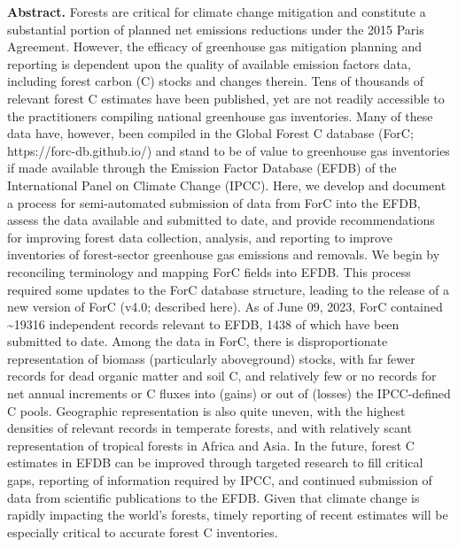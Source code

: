 \documentclass[, manuscript]{copernicus}
\begin{document}
\textbf{Abstract.} Forests are critical for climate change mitigation
and constitute a substantial portion of planned net emissions reductions
under the 2015 Paris Agreement. However, the efficacy of greenhouse gas
mitigation planning and reporting is dependent upon the quality of
available emission factors data, including forest carbon (C) stocks and
changes therein. Tens of thousands of relevant forest C estimates have
been published, yet are not readily accessible to the practitioners
compiling national greenhouse gas inventories. Many of these data have,
however, been compiled in the Global Forest C database (ForC;
https://forc-db.github.io/) and stand to be of value to greenhouse gas
inventories if made available through the Emission Factor Database
(EFDB) of the International Panel on Climate Change (IPCC). Here, we
develop and document a process for semi-automated submission of data
from ForC into the EFDB, assess the data available and submitted to
date, and provide recommendations for improving forest data collection,
analysis, and reporting to improve inventories of forest-sector
greenhouse gas emissions and removals. We begin by reconciling
terminology and mapping ForC fields into EFDB. This process required
some updates to the ForC database structure, leading to the release of a
new version of ForC (v4.0; described here). As of June 09, 2023, ForC
contained \textasciitilde19316 independent records relevant to EFDB,
1438 of which have been submitted to date. Among the data in ForC, there
is disproportionate representation of biomass (particularly aboveground)
stocks, with far fewer records for dead organic matter and soil C, and
relatively few or no records for net annual increments or C fluxes into
(gains) or out of (losses) the IPCC-defined C pools. Geographic
representation is also quite uneven, with the highest densities of
relevant records in temperate forests, and with relatively scant
representation of tropical forests in Africa and Asia. In the future,
forest C estimates in EFDB can be improved through targeted research to
fill critical gaps, reporting of information required by IPCC, and
continued submission of data from scientific publications to the EFDB.
Given that climate change is rapidly impacting the world's forests,
timely reporting of recent estimates will be especially critical to
accurate forest C inventories.

\introduction[Introduction]
\end{document}
